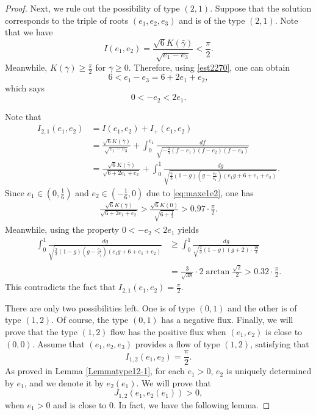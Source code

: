 \documentclass[reqno,12pt]{amsart}
\begin{document}
\begin{proof}
Next, we rule out the possibility of type $(2, 1)$. Suppose that the solution corresponds to the triple of roots $(e_1, e_2, e_3)$ and is of the type $(2, 1)$. 
Note that we have
   \begin{equation}
   \label{est2270}
  I(e_1, e_2) = \frac{\sqrt{6}K( \bar{\gamma})}{\sqrt{e_1 -e_3}} < \frac{\pi}{2}.  
\end{equation}
Meanwhile,  $K( \bar{\gamma})\geq \frac{\pi}{2}$ for $ \bar{\gamma} \geq 0$. Therefore, using \eqref{est2270}, one can obtain
\begin{equation*}
    6<e_1 - e_3 =  6+ 2e_1 + e_2 , 
\end{equation*}
which says 
\begin{equation}\label{new4}
   0<-e_2< 2 e_1. 
\end{equation}

Note that 
\begin{equation*}
\begin{array}{ll}
     I_{2, 1}(e_1, e_2) & = I(e_1, e_2) + I_{+}(e_1, e_2)\\
     & \displaystyle = \frac{\sqrt{6}K( \bar{\gamma})}{\sqrt{e_1 - e_3}} + \int_0^{e_1}\frac{df}{\sqrt{-\frac23 (f-e_1) (f-e_2) (f-e_3)}}\\
     & \displaystyle = \frac{\sqrt{6} K( \bar{\gamma})}{\sqrt{6+ 2e_1 + e_2}} + \int_0^1 \frac{dg}{\sqrt{\frac23 (1-g) ( g- \frac{e_2}{e_1}) ( e_1 g + 6 + e_1 + e_2)}}.
    \end{array}
\end{equation*}
Since $e_1\in (0,\frac{1}{6})$ and $e_2\in (-\frac{1}{6},0)$ due to \eqref{eq:maxe1e2},  one has
\begin{align*}
 \frac{\sqrt{6} K( \bar{\gamma})}{\sqrt{6+ 2e_1 + e_2}} > \frac{\sqrt{6}K(0)}{\sqrt{6+ \frac13}} > 0.97\cdot \frac{\pi}{2}.
\end{align*}
Meanwhile, using the property $0<-e_2 < 2e_1$ yields
\begin{align*}
    \int_0^1 \frac{dg}{\sqrt{\frac23 (1-g) ( g- \frac{e_2}{e_1}) ( e_1 g + 6 + e_1 + e_2)}} & \geq \int_0^1 \frac{dg}{\sqrt{\frac23 (1-g) (g + 2) \cdot \frac{19}{3} }} \\
    & = \frac{3}{\sqrt{38}} \cdot 2 \arctan\frac{\sqrt{2}}{2} >0.32 \cdot \frac{\pi}{2}. 
\end{align*}
This contradicts the fact that $I_{2, 1}(e_1, e_2) =\frac{\pi}{2}.$

There are only two possibilities left. One is of type $(0, 1)$ and the other is of type $(1, 2)$. Of course, the type $(0, 1)$ has a negative flux. Finally, we will prove that the type $(1, 2)$ flow has the positive flux when $(e_1, e_2)$ is close to $(0, 0)$. 
Assume that $(e_1, e_2, e_3)$ provides a flow of type $(1, 2)$, satisfying that 
\begin{equation*}
    I_{1, 2}(e_1, e_2) = \frac{\pi}{2}. 
\end{equation*}
 As proved in Lemma \ref{Lemmatype12-1}, for each $e_1>0$, $e_2$ is uniquely determined by $e_1$, and we denote it by $e_2(e_1)$. We will prove that 
 \begin{equation*}
     J_{1, 2}(e_1, e_2(e_1)) > 0,
 \end{equation*}
 when $e_1>0$ and is close to $0$. In fact, we have the following lemma.


\end{proof}
\end{document}
